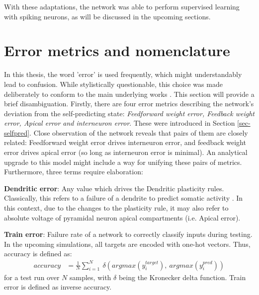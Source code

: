With these adaptations, the network was able to perform supervised learning with spiking neurons, as will be discussed
in the upcoming sections.

\section{Error metrics and nomenclature}

In this thesis, the word 'error' is used frequently, which might understandably lead to confusion. While stylistically
questionable, this choice was made deliberately to conform to the main underlying works
\citep{urbanczik2014learning,sacramento2018dendritic,whittington2019theories,Haider2021}. This section will provide a
brief disambiguation. Firstly, there are four error metrics describing the network's deviation from the self-predicting
state: \textit{Feedforward weight error, Feedback weight error, Apical error and interneuron error}. These were
introduced in Section \ref{sec-selfpred}. Close observation of the network reveals that pairs of them are closely
related: Feedforward weight error drives interneuron error, and feedback weight error drives apical error (so long as
interneuron error is minimal). An analytical upgrade to this model might include a way for unifying these pairs of
metrics. Furthermore, three terms require elaboration:\newline

\textbf{Dendritic error}: Any value which drives the Dendritic plasticity rules. Classically, this refers to a failure
of a dendrite to predict somatic activity \citep{urbanczik2014learning}. In this context, due to the changes to the
plasticity rule, it may also refer to absolute voltage of pyramidal neuron apical compartments (i.e. Apical error). \newline

\textbf{Train error}: Failure rate of a network to correctly classify inputs during testing. In the upcoming
simulations, all targets are encoded with one-hot vectors. Thus, accuracy is defined as:
\begin{align*}
    accuracy &= \frac{1}{N} \sum_{i=1}^N \  \delta \left(argmax(y^{target}_i),\ argmax(y^{pred}_i) \right)
\end{align*}
for a test run over $N$ samples, with $\delta$ being the Kronecker delta function. Train error is defined as inverse
accuracy.\newline

